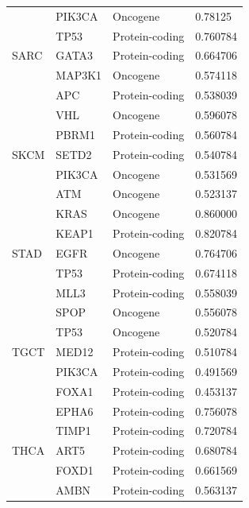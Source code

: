 \begin{table}
\begin{center}
{\begin{tabular}{l|l|l|l}
        \midrule
        \multirow{5}{*}{SARC} & PIK3CA & Oncogene & 0.78125 \\ %
        & TP53 & Protein-coding & 0.760784 \\ %
        & GATA3  & Protein-coding & 0.664706 \\ %
        & MAP3K1  & Oncogene & 0.574118 \\ %
        & APC   & Protein-coding & 0.538039 \\ 
        \midrule
        \multirow{5}{*}{SKCM} & VHL & Oncogene & 0.596078 \\ %
        & PBRM1 & Protein-coding  & 0.560784 \\ %
        & SETD2 & Protein-coding & 0.540784 \\ %
        & PIK3CA & Oncogene & 0.531569 \\ %
        & ATM & Oncogene & 0.523137 \\ %
        \midrule
        \multirow{5}{*}{STAD}& KRAS & Oncogene & 0.860000 \\ %
        & KEAP1 & Protein-coding & 0.820784 \\ %
        & EGFR & Oncogene & 0.764706 \\ %
        & TP53 & Protein-coding & 0.674118 \\ %
        & MLL3 & Protein-coding & 0.558039 \\ %
        \midrule
        \multirow{5}{*}{TGCT}& SPOP & Oncogene & 0.556078 \\ %
        & TP53 & Oncogene & 0.520784 \\ %
        & MED12 & Protein-coding & 0.510784 \\ %
        & PIK3CA & Protein-coding & 0.491569 \\ %
        & FOXA1 & Protein-coding & 0.453137 \\ %
        \midrule
        \multirow{5}{*}{THCA}& EPHA6 & Protein-coding & 0.756078 \\ %
        & TIMP1 & Protein-coding & 0.720784 \\ %
        & ART5 & Protein-coding & 0.680784 \\ %
        & FOXD1 & Protein-coding & 0.661569 \\ %
        & AMBN & Protein-coding & 0.563137 \\ %

\end{tabular}}
\end{center}
\end{table}
